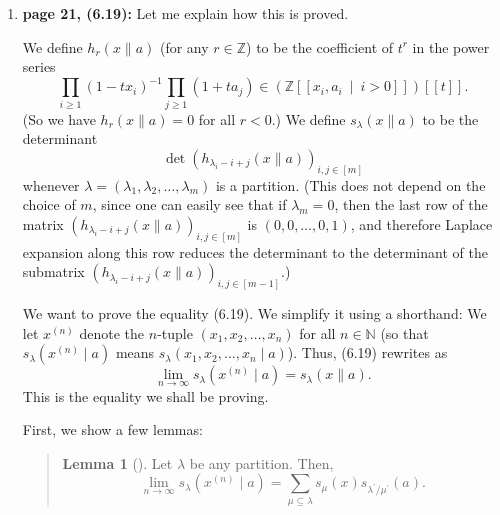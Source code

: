 \documentclass[numbers=enddot,12pt,final,onecolumn,notitlepage]{scrartcl}%
\newenvironment{statement}{\begin{quote}}{\end{quote}}
\theoremstyle{definition}
\newtheorem{lem}[theo]{Lemma}
\newenvironment{lemmain}[1][]
{\begin{statement}\begin{lem}[#1]}
{\end{lem}\end{statement}}
\newenvironment{lemmain}[1][Proof]{\noindent\textbf{#1.} }{\ \rule{0.5em}{0.5em}}
\let\sumnonlimits\sum
\let\prodnonlimits\prod
\renewcommand{\sum}{\sumnonlimits\limits}
\renewcommand{\prod}{\prodnonlimits\limits}
\begin{document}
\begin{enumerate}
\item \textbf{page 21, (6.19):} Let me explain how this is proved.

We define $h_{r}\left(  x\parallel a\right)  $ (for any $r\in\mathbb{Z}$) to
be the coefficient of $t^{r}$ in the power series
\[
\prod_{i\geq1}\left(  1-tx_{i}\right)  ^{-1}\prod_{j\geq1}\left(
1+ta_{j}\right)  \in\left(  \mathbb{Z}\left[  \left[  x_{i},a_{i}%
\ \mid\ i>0\right]  \right]  \right)  \left[  \left[  t\right]  \right]  .
\]
(So we have $h_{r}\left(  x\parallel a\right)  =0$ for all $r<0$.) We define
$s_{\lambda}\left(  x\parallel a\right)  $ to be the determinant
\[
\det\left(  h_{\lambda_{i}-i+j}\left(  x\parallel a\right)  \right)
_{i,j\in\left[  m\right]  }%
\]
whenever $\lambda=\left(  \lambda_{1},\lambda_{2},\ldots,\lambda_{m}\right)  $
is a partition. (This does not depend on the choice of $m$, since one can
easily see that if $\lambda_{m}=0$, then the last row of the matrix $\left(
h_{\lambda_{i}-i+j}\left(  x\parallel a\right)  \right)  _{i,j\in\left[
m\right]  }$ is $\left(  0,0,\ldots,0,1\right)  $, and therefore Laplace
expansion along this row reduces the determinant to the determinant of the
submatrix $\left(  h_{\lambda_{i}-i+j}\left(  x\parallel a\right)  \right)
_{i,j\in\left[  m-1\right]  }$.)

We want to prove the equality (6.19). We simplify it using a shorthand: We let
$x^{\left(  n\right)  }$ denote the $n$-tuple $\left(  x_{1},x_{2}%
,\ldots,x_{n}\right)  $ for all $n\in\mathbb{N}$ (so that $s_{\lambda}\left(
x^{\left(  n\right)  }\mid a\right)  $ means $s_{\lambda}\left(  x_{1}%
,x_{2},\ldots,x_{n}\mid a\right)  $). Thus, (6.19) rewrites as
\begin{equation}
\lim\limits_{n\rightarrow\infty}s_{\lambda}\left(  x^{\left(  n\right)  }\mid
a\right)  =s_{\lambda}\left(  x\parallel a\right)  . \label{p21.6.19.rewr}%
\end{equation}
This is the equality we shall be proving.

First, we show a few lemmas:

\begin{lemmain}
\label{lem.p21.TO}Let $\lambda$ be any partition. Then,%
\[
\lim\limits_{n\rightarrow\infty}s_{\lambda}\left(  x^{\left(  n\right)  }\mid
a\right)  =\sum_{\mu\subseteq\lambda}s_{\mu}\left(  x\right)  s_{\lambda
^{\prime}/\mu^{\prime}}\left(  a\right)  .
\]

\end{lemmain}


\end{enumerate}
\end{document}
